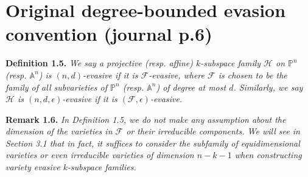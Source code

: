 \documentclass[10pt,a4paper]{article}
\newcommand{\PP}{\mathbb P}
\newcommand{\Aspace}{\mathbb A}
\newenvironment{result}[1]{\par\medskip\noindent\textbf{#1.}\itshape}{\par\medskip}
\begin{document}
\section*{Original degree-bounded evasion convention (journal p.6)}
\begin{result}{Definition 1.5}
We say a projective (resp. affine) $k$-subspace family $\mathcal H$ on $\PP^n$ (resp. $\Aspace^n$) is $(n,d)$-evasive if it is $\mathcal F$-evasive, where $\mathcal F$ is chosen to be the family of all subvarieties of $\PP^n$ (resp. $\Aspace^n$) of degree at most $d$. Similarly, we say $\mathcal H$ is $(n,d,\epsilon)$-evasive if it is $(\mathcal F,\epsilon)$-evasive.
\end{result}
\begin{result}{Remark 1.6}
In Definition 1.5, we do not make any assumption about the dimension of the varieties in $\mathcal F$ or their irreducible components. We will see in Section 3.1 that in fact, it suffices to consider the subfamily of equidimensional varieties or even irreducible varieties of dimension $n-k-1$ when constructing variety evasive $k$-subspace families.
\end{result}
\end{document}
